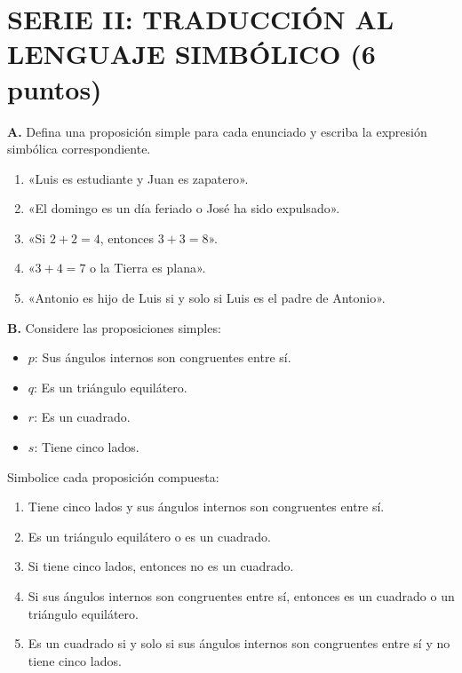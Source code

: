 \documentclass[11pt, letterpaper]{article}
\begin{document}
\vspace{0.3cm}

\section*{\color{AzulMontano} SERIE II: TRADUCCIÓN AL LENGUAJE SIMBÓLICO (6 puntos)}
\noindent \textbf{A.} Defina una proposición simple para cada enunciado y escriba la expresión simbólica correspondiente.

\begin{enumerate}[label=\textbf{\arabic*.}, itemsep=0.25cm]
    \item «Luis es estudiante y Juan es zapatero».
    \item «El domingo es un día feriado o José ha sido expulsado».
    \item «Si $2 + 2 = 4$, entonces $3 + 3 = 8$».
    \item «$3 + 4 = 7$ o la Tierra es plana».
    \item «Antonio es hijo de Luis si y solo si Luis es el padre de Antonio».
\end{enumerate}

\vspace{0.2cm}
\noindent \textbf{B.} Considere las proposiciones simples:
\begin{itemize}[itemsep=0.1cm]
    \item $p$: Sus ángulos internos son congruentes entre sí.
    \item $q$: Es un triángulo equilátero.
    \item $r$: Es un cuadrado.
    \item $s$: Tiene cinco lados.
\end{itemize}
Simbolice cada proposición compuesta:

\begin{enumerate}[label=\textbf{\arabic*.}, start=6, itemsep=0.25cm]
    \item Tiene cinco lados y sus ángulos internos son congruentes entre sí.
    \item Es un triángulo equilátero o es un cuadrado.
    \item Si tiene cinco lados, entonces no es un cuadrado.
    \item Si sus ángulos internos son congruentes entre sí, entonces es un cuadrado o un triángulo equilátero.
    \item Es un cuadrado si y solo si sus ángulos internos son congruentes entre sí y no tiene cinco lados.
\end{enumerate}
\end{document}
